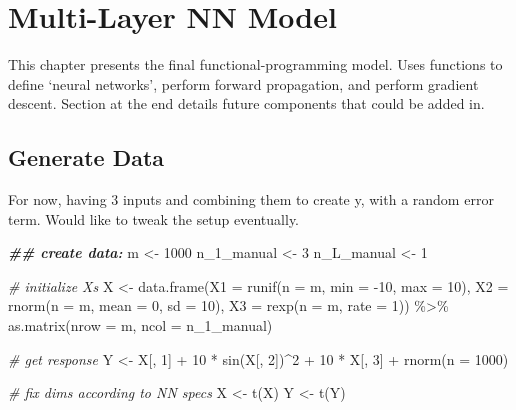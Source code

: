 \documentclass[
]{book}
\newenvironment{Shaded}{\begin{snugshade}}{\end{snugshade}}
\newcommand{\AttributeTok}[1]{\textcolor[rgb]{0.77,0.63,0.00}{#1}}
\newcommand{\CommentTok}[1]{\textcolor[rgb]{0.56,0.35,0.01}{\textit{#1}}}
\newcommand{\DecValTok}[1]{\textcolor[rgb]{0.00,0.00,0.81}{#1}}
\newcommand{\DocumentationTok}[1]{\textcolor[rgb]{0.56,0.35,0.01}{\textbf{\textit{#1}}}}
\newcommand{\FunctionTok}[1]{\textcolor[rgb]{0.00,0.00,0.00}{#1}}
\newcommand{\NormalTok}[1]{#1}
\newcommand{\OtherTok}[1]{\textcolor[rgb]{0.56,0.35,0.01}{#1}}
\newcommand{\SpecialCharTok}[1]{\textcolor[rgb]{0.00,0.00,0.00}{#1}}
\begin{document}
\hypertarget{multi-layer-nn-model}{%
\chapter{Multi-Layer NN Model}\label{multi-layer-nn-model}}

This chapter presents the final functional-programming model. Uses functions to define `neural networks', perform forward propagation, and perform gradient descent. Section at the end details future components that could be added in.

\hypertarget{generate-data-1}{%
\section{Generate Data}\label{generate-data-1}}

For now, having 3 inputs and combining them to create y, with a random error term. Would like to tweak the setup eventually.

\begin{Shaded}
\begin{Highlighting}[]
\DocumentationTok{\#\# create data:}
\NormalTok{m }\OtherTok{\textless{}{-}} \DecValTok{1000}
\NormalTok{n\_1\_manual }\OtherTok{\textless{}{-}} \DecValTok{3}
\NormalTok{n\_L\_manual }\OtherTok{\textless{}{-}} \DecValTok{1}

\CommentTok{\# initialize Xs}
\NormalTok{X }\OtherTok{\textless{}{-}} \FunctionTok{data.frame}\NormalTok{(}\AttributeTok{X1 =} \FunctionTok{runif}\NormalTok{(}\AttributeTok{n =}\NormalTok{ m, }\AttributeTok{min =} \SpecialCharTok{{-}}\DecValTok{10}\NormalTok{, }\AttributeTok{max =} \DecValTok{10}\NormalTok{),}
                \AttributeTok{X2 =} \FunctionTok{rnorm}\NormalTok{(}\AttributeTok{n =}\NormalTok{ m, }\AttributeTok{mean =} \DecValTok{0}\NormalTok{, }\AttributeTok{sd =} \DecValTok{10}\NormalTok{),}
                \AttributeTok{X3 =} \FunctionTok{rexp}\NormalTok{(}\AttributeTok{n =}\NormalTok{ m, }\AttributeTok{rate =} \DecValTok{1}\NormalTok{)) }\SpecialCharTok{\%\textgreater{}\%}
  \FunctionTok{as.matrix}\NormalTok{(}\AttributeTok{nrow =}\NormalTok{ m,}
            \AttributeTok{ncol =}\NormalTok{ n\_1\_manual)}

\CommentTok{\# get response}
\NormalTok{Y }\OtherTok{\textless{}{-}}\NormalTok{ X[, }\DecValTok{1}\NormalTok{] }\SpecialCharTok{+} \DecValTok{10} \SpecialCharTok{*} \FunctionTok{sin}\NormalTok{(X[, }\DecValTok{2}\NormalTok{])}\SpecialCharTok{\^{}}\DecValTok{2} \SpecialCharTok{+} \DecValTok{10} \SpecialCharTok{*}\NormalTok{ X[, }\DecValTok{3}\NormalTok{] }\SpecialCharTok{+} \FunctionTok{rnorm}\NormalTok{(}\AttributeTok{n =} \DecValTok{1000}\NormalTok{)}

\CommentTok{\# fix dims according to NN specs}
\NormalTok{X }\OtherTok{\textless{}{-}} \FunctionTok{t}\NormalTok{(X)}
\NormalTok{Y }\OtherTok{\textless{}{-}} \FunctionTok{t}\NormalTok{(Y)}
\end{Highlighting}
\end{Shaded}
\end{document}
